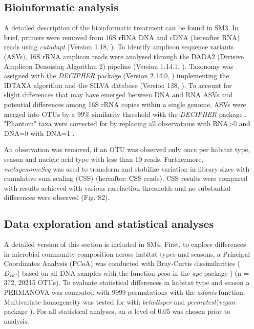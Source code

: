 \documentclass[12pt,a4paper]{article} %
\begin{document}
\subsection*{Bioinformatic analysis}
A detailed description of the bioinformatic treatment can be found in SM3. In brief, primers were removed from 16S rRNA DNA and cDNA (hereafter RNA) reads using \textit{cutadapt} (Version 1.18, \citet{Martin2013}). To identify amplicon sequence variants (ASVs), 16S rRNA amplicon reads were analysed through the DADA2 (Divisive Amplicon Denoising Algorithm 2) pipeline (Version 1.14.1, \citet{Callahan2017}). Taxonomy was assigned with the \textit{DECIPHER} package (Version 2.14.0, \citet{Wright2016}) implementing the IDTAXA algorithm \citep{Murali2018} and the SILVA database (Version 138, \citet{Pruesse2007}). To account for slight differences that may have emerged between DNA and RNA ASVs and potential differences among 16S rRNA copies within a single genome, ASVs were merged into OTUs by a 99\% similarity threshold \citep{Vetrovsky2013} with the \textit{DECIPHER} package \citep{Wright2016}. "Phantom" taxa were corrected for by replacing all observations with RNA>0 and DNA=0 with DNA=1 \citep{Bowsher2019}.

An observation was removed, if an OTU was observed only once per habitat type, season and nucleic acid type with less than 10 reads. Furthermore, \textit{metagenomeSeq} was used to transform and stabilize variation in library sizes with cumulative sum scaling (CSS) \citep{Paulson2013} (hereafter: CSS reads). CSS results were compared with results achieved with various rarefaction thresholds and no substantial differences were observed (Fig. S2).

\subsection*{Data exploration and statistical analyses}
A detailed version of this section is included in SM4. First, to explore differences in microbial community composition across habitat types and seasons, a Principal Coordinates Analysis (PCoA) was conducted with Bray-Curtis dissimilarities ($D_{BC}$) \citep{Bray1957, Legendre1998} based on all DNA samples with the function \textit{pcoa} in the \textit{ape} package \citep{Paradis2018}) (n = 372, 20215 OTUs). To evaluate statistical differences in habitat type and season a PERMANOVA was computed with 9999 permutations with the \textit{adonis} function. Multivariate homogeneity was tested for with \textit{betadisper} and \textit{permutest}(\textit{vegan} package \citep{Oksanen2017}). For all statistical analyses, an $\alpha$ level of 0.05 was chosen prior to analysis.
\end{document}
